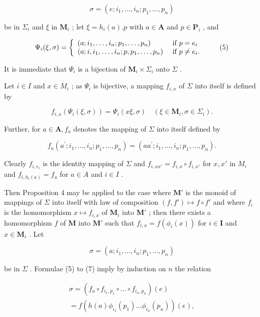 \[
\sigma = (e; i _ {1}, \dots , i _ {n}; p _ {1}, \dots , p _ {n})
\]

be in \(\Sigma_{i}\) and \(\xi\) in \(\mathbf{M}_i\) ; let \(\xi = h_i(a).p\) with \(a\in \mathbf{A}\) and \(p\in \mathbf{P}_i\) , and

\[
\Psi_ {i} (\xi , \sigma) = \left\{ \begin{array}{l l} (a; i _ {1}, \dots , i _ {n}; p _ {1}, \dots , p _ {n}) & \text { if } p = e _ {i} \\ (a; i, i _ {1}, \dots , i _ {n}; p, p _ {1}, \dots , p _ {n}) & \text { if } p \neq e _ {i}. \end{array} \right.\tag{5}
\]

It is immediate that \(\Psi_{i}\) is a bijection of \(\mathbf{M}_i\times \Sigma_i\) onto \(\Sigma\) .

Let \(i \in I\) and \(x \in M_i\) ; as \(\Psi_i\) is bijective, a mapping \(f_{i,x}\) of \(\Sigma\) into itself is defined by

\[
f _ {i, x} (\Psi_ {i} (\xi , \sigma)) = \Psi_ {i} (x \xi , \sigma) \quad (\xi \in \mathbf {M} _ {i}, \sigma \in \Sigma_ {i}).\tag{6}
\]

Further, for \(a \in \mathbf{A}, f_a\) denotes the mapping of \(\Sigma\) into itself defined by

\[
f _ {a} (a ^ {\prime}; i _ {1}, \dots , i _ {n}; p _ {1}, \dots , p _ {n}) = (a a ^ {\prime}; i _ {1}, \dots , i _ {n}; p _ {1}, \dots , p _ {n}).\tag{7}
\]

Clearly \(f_{i, e_i}\) is the identity mapping of \(\Sigma\) and \(f_{i, xx'} = f_{i, x} \circ f_{i, x'}\) for \(x, x'\) in \(M_i\) and \(f_{i, h_i(a)} = f_a\) for \(a \in A\) and \(i \in I\) .

Then Proposition 4 may be applied to the case where \(\mathbf{M}'\) is the monoid of mappings of \(\Sigma\) into itself with law of composition \((f, f') \mapsto f \circ f'\) and where \(f_{i}\) is the homomorphism \(x \mapsto f_{i,x}\) of \(\mathbf{M}_{i}\) into \(\mathbf{M}'\) ; then there exists a homomorphism \(f\) of \(\mathbf{M}\) into \(\mathbf{M}'\) such that \(f_{i,x} = f(\phi_i(x))\) for \(i \in \mathbf{I}\) and \(x \in \mathbf{M}_i\) . Let

\[
\sigma = (a; i _ {1}, \dots , i _ {n}; p _ {1}, \dots , p _ {n})
\]

be in \(\Sigma\) . Formulae (5) to (7) imply by induction on \(n\) the relation

\[
\begin{array}{l} \sigma = (f _ {a} \circ f _ {i _ {1}, p _ {1}} \circ \dots \circ f _ {i _ {n}, p _ {n}}) (e) \\ = f (h (a) \phi_ {i _ {1}} (p _ {1}) \dots \phi_ {i _ {n}} (p _ {n})) (e), \end{array}
\]

